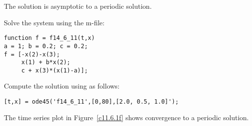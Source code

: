 \begin{figure}[htb]
     \centerline{%
     }
\end{figure} 

 \ans The solution is asymptotic to a periodic solution.

\soln Solve the system using the m-file:
\begin{verbatim}
function f = f14_6_11(t,x)
a = 1; b = 0.2; c = 0.2;
f = [-x(2)-x(3); 
     x(1) + b*x(2); 
     c + x(3)*(x(1)-a)];
\end{verbatim}

Compute the solution using \Matlab as follows:
\begin{verbatim}
[t,x] = ode45('f14_6_11',[0,80],[2.0, 0.5, 1.0]');
\end{verbatim}
The time series plot in Figure~\ref{c11.6.1f} shows convergence to a periodic solution.  

\begin{figure}[htb]
     \centerline{%
     }
\end{figure} 

















